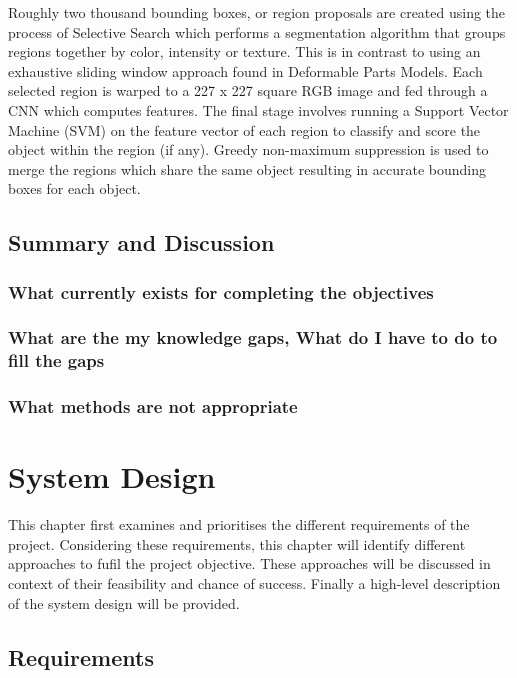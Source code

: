 \documentclass{mproj}
\begin{document}
Roughly two thousand bounding boxes, or region proposals are created using the process of Selective Search which performs a segmentation algorithm that groups regions together by color, intensity or texture.\cite{Sande2013} This is in contrast to using an exhaustive sliding window approach found in Deformable Parts Models.\cite{voc-release4} Each selected region is warped to a 227 x 227 square RGB image and fed through a CNN which computes features. The final stage involves running a Support Vector Machine (SVM) on the feature vector of each region to classify and score the object within the region (if any). Greedy non-maximum suppression is used to merge the regions which share the same object resulting in accurate bounding boxes for each object. 


\section{Summary and Discussion}
\subsection{What currently exists for completing the objectives}
\subsection{What are the my knowledge gaps, What do I have to do to fill the gaps}
\subsection{What methods are not appropriate}

\chapter{System Design}

This chapter first examines and prioritises the different requirements of the project. Considering these requirements, this chapter will identify different approaches to fufil the project objective. These approaches will be discussed in context of their feasibility and chance of success. Finally a high-level description of the system design will be provided. 

\section{Requirements}
 
\end{document}
